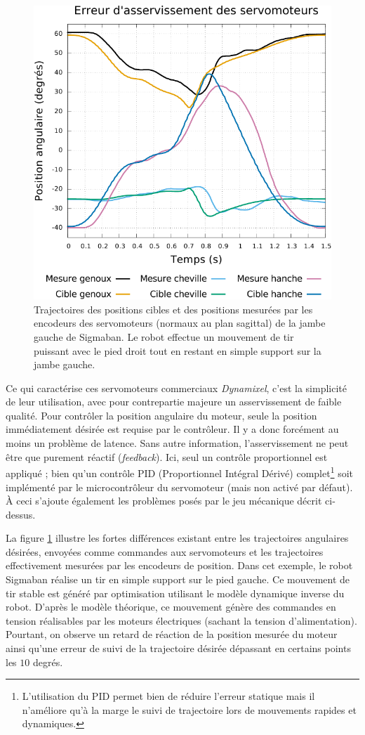 \begin{figure}[htb]
    \centerfloat
    \includegraphics[type=pdf,ext=.pdf,read=.pdf,width=0.8\linewidth]{../plot/motors_control}
    \caption{\label{fig:robot_control} 
        Trajectoires des positions cibles et des positions mesurées par les encodeurs 
        des servomoteurs (normaux au plan sagittal) de la jambe gauche de Sigmaban.
        Le robot effectue un mouvement de tir puissant avec le pied droit tout en restant 
        en simple support sur la jambe gauche.
    }
\end{figure}

Ce qui caractérise ces servomoteurs commerciaux \textit{Dynamixel}, 
c'est la simplicité de leur utilisation, avec pour contrepartie majeure 
un asservissement de faible qualité.
Pour contrôler la position angulaire du moteur, seule la position
immédiatement désirée est requise par le contrôleur.
Il y a donc forcément au moins un problème de latence.
Sans autre information, l'asservissement ne peut être que purement
réactif (\textit{feedback}).
Ici, seul un contrôle proportionnel est appliqué ; bien qu'un contrôle
PID (Proportionnel Intégral Dérivé) complet\footnote{L'utilisation du PID permet bien de réduire
l'erreur statique mais il n'améliore qu'à la marge le suivi de trajectoire
lors de mouvements rapides et dynamiques.} soit implémenté par le microcontrôleur 
du servomoteur (mais non activé par défaut).
À ceci s'ajoute également les problèmes posés par le jeu mécanique 
décrit ci-dessus.

La figure \ref{fig:robot_control} illustre les fortes différences existant entre
les trajectoires angulaires désirées, envoyées comme commandes aux servomoteurs
et les trajectoires effectivement mesurées par les encodeurs de position.
Dans cet exemple, le robot Sigmaban réalise un tir en simple support sur le pied 
gauche. Ce mouvement de tir stable est généré par optimisation utilisant le modèle 
dynamique inverse du robot. D'après le modèle théorique, ce mouvement génère des commandes
en tension réalisables par les moteurs électriques (sachant la tension d'alimentation).
Pourtant, on observe un retard de réaction de la position mesurée du moteur
ainsi qu'une erreur de suivi de la trajectoire désirée dépassant
en certains points les $10$ degrés.

